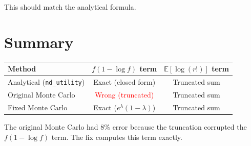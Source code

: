 \documentclass[11pt]{article}
\newcommand{\E}{\mathbb{E}}
\begin{document}
This should match the analytical formula.

\section{Summary}

\begin{center}
\begin{tabular}{|l|c|c|}
\hline
\textbf{Method} & \textbf{$f(1-\log f)$ term} & \textbf{$\E[\log(r!)]$ term} \\
\hline
Analytical (\texttt{nd\_utility}) & Exact (closed form) & Truncated sum \\
Original Monte Carlo & \textcolor{red}{Wrong (truncated)} & Truncated sum \\
Fixed Monte Carlo & Exact ($e^\lambda(1-\lambda)$) & Truncated sum \\
\hline
\end{tabular}
\end{center}

The original Monte Carlo had 8\% error because the truncation corrupted the $f(1-\log f)$ term. The fix computes this term exactly.
\end{document}
